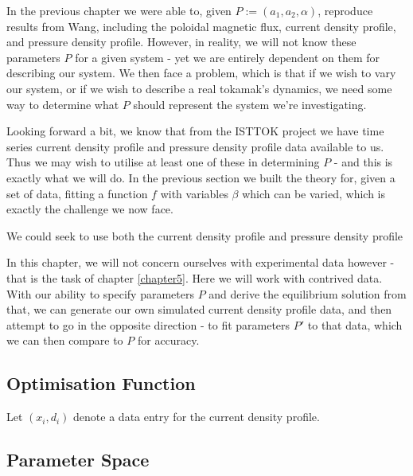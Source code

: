 In the previous chapter we were able to, given $P := (a_1, a_2, \alpha)$, reproduce results from Wang, including 
the poloidal magnetic flux, current density profile, and pressure density profile. However, in reality, we will 
not know these parameters $P$ for a given system - yet we are entirely dependent on them for describing our system. 
We then face a problem, which is that if we wish to vary our system, or if we wish to describe a real tokamak's dynamics,
we need some way to determine what $P$ should represent the system we're investigating. 

Looking forward a bit, we know that from the ISTTOK project we have time series current density profile and pressure density profile data 
available to us. Thus we may wish to utilise at least one of these in determining $P$ - and this is exactly what we will do. 
In the previous section we built the theory for, given a set of data, fitting a function $f$ with variables $\beta$ which can be varied, 
which is exactly the challenge we now face. 

We could seek to use both the current density profile and pressure density profile 

In this chapter, we will not concern ourselves with experimental data however - that is the task of chapter \ref{chapter5}. Here we 
will work with contrived data. With our ability to specify parameters $P$ and derive the equilibrium solution from that, we can generate 
our own simulated current density profile data, and then attempt to go in the opposite direction - to fit parameters $P'$ to that data, 
which we can then compare to $P$ for accuracy.

\subsection{Optimisation Function}

Let $(x_i, d_i)$ denote a data entry for the current density profile. 




\subsection{Parameter Space}


